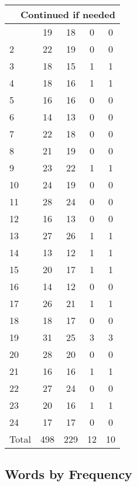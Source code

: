 \begin{center}
\begin{longtable}{l|c|c|c|c}
\hline \multicolumn{5}{|r|}{{Continued if needed}} \\ \hline
\endfoot 
1 & 19 & 18 & 0 & 0\\ \hline
2 & 22 & 19 & 0 & 0\\ \hline
3 & 18 & 15 & 1 & 1\\ \hline
4 & 18 & 16 & 1 & 1\\ \hline
5 & 16 & 16 & 0 & 0\\ \hline
6 & 14 & 13 & 0 & 0\\ \hline
7 & 22 & 18 & 0 & 0\\ \hline
8 & 21 & 19 & 0 & 0\\ \hline
9 & 23 & 22 & 1 & 1\\ \hline
10 & 24 & 19 & 0 & 0\\ \hline
11 & 28 & 24 & 0 & 0\\ \hline
12 & 16 & 13 & 0 & 0\\ \hline
13 & 27 & 26 & 1 & 1\\ \hline
14 & 13 & 12 & 1 & 1\\ \hline
15 & 20 & 17 & 1 & 1\\ \hline
16 & 14 & 12 & 0 & 0\\ \hline
17 & 26 & 21 & 1 & 1\\ \hline
18 & 18 & 17 & 0 & 0\\ \hline
19 & 31 & 25 & 3 & 3\\ \hline
20 & 28 & 20 & 0 & 0\\ \hline
21 & 16 & 16 & 1 & 1\\ \hline
22 & 27 & 24 & 0 & 0\\ \hline
23 & 20 & 16 & 1 & 1\\ \hline
24 & 17 & 17 & 0 & 0\\ \hline
\hline \hline
Total & 498 & 229 & 12 & 10



\end{longtable}
\end{center}

 
\subsection{Words by Frequency}

